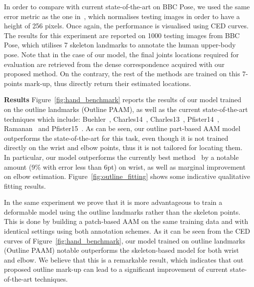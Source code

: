 In order to compare with current state-of-the-art on BBC Pose, we used the same error metric as the one in~\cite{pfister2015flowing}, which normalises testing images in order to have a height of 256 pixels. Once again, the performance is visualised using CED curves. The results for this experiment are reported on 1000 testing images from BBC Pose, which utilises 7 skeleton landmarks to annotate the human upper-body pose. Note that in the case of our model, the final joints locations required for evaluation are retrieved from the dense correspondence acquired with our proposed method. On the contrary, the rest of the methods are trained on this 7-points mark-up, thus directly return their estimated locations.

\noindent\textbf{Results} Figure~\ref{fig:hand_benchmark} reports the results of our model trained on the outline landmarks (Outline PAAM), as well as the current state-of-the-art techniques which include: Buehler~\cite{buehler2011upper}, Charles14~\cite{charles2014upper}, Charles13~\cite{charles2013domain}, Pfister14~\cite{pfister2015deep}, Ramanan~\cite{yang2013articulated} and Pfister15~\cite{pfister2015flowing}. As can be seen, our outline part-based AAM model outperforms the state-of-the-art for this task, even though it is not trained directly on the wrist and elbow points, thus it is not tailored for locating them. In particular, our model outperforms the currently best method~\cite{pfister2015flowing} by a notable amount (9\% with error less than 6pt) on wrist, as well as marginal improvement on elbow estimation. Figure~\ref{fig:outline_fitting} shows some indicative qualitative fitting results.

In the same experiment we prove that it is more advantageous to train a deformable model using the outline landmarks rather than the skeleton points. This is done by building a patch-based AAM on the same training data and with identical settings using both annotation schemes. As it can be seen from the  CED curves of Figure~\ref{fig:hand_benchmark}, our model trained on outline landmarks (Outline PAAM) notable outperforms the skeleton-based model for both wrist and elbow. We believe that this is a remarkable result, which indicates that out proposed outline mark-up can lead to a significant improvement of current state-of-the-art techniques.


